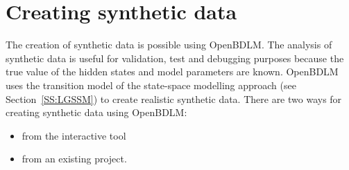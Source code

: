 \section{Creating synthetic data}
\label{S:SYNTHETIC}
The creation of synthetic data is possible using OpenBDLM.
The analysis of synthetic data is useful for validation, test and debugging purposes because the true value of the hidden states and model parameters are known.
OpenBDLM uses the transition model  of the state-space modelling approach (see Section~\ref{SS:LGSSM}) to create realistic synthetic data.
There are two ways for creating synthetic data using OpenBDLM:

\begin{itemize}
\item from the interactive tool
\item from an existing project.
\end{itemize}

